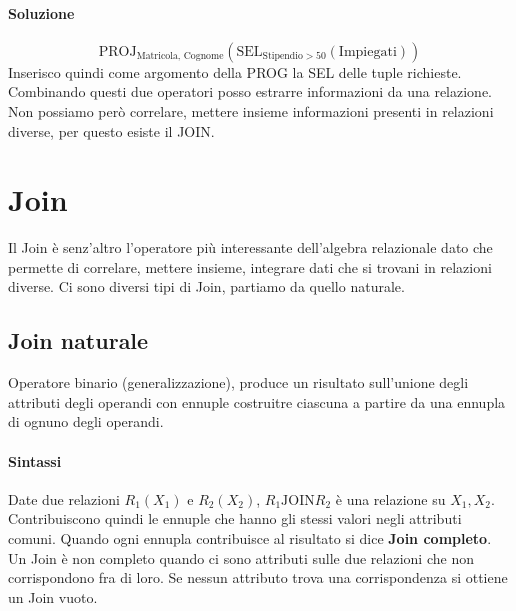 \paragraph*{Soluzione}
\begin{equation*}
    \text{PROJ}_{\text{Matricola, Cognome}}(\text{SEL}_{\text{Stipendio} > 50}(\text{Impiegati}))
\end{equation*}
Inserisco quindi come argomento della PROG la SEL delle tuple richieste. Combinando questi due
operatori posso estrarre informazioni da una relazione. Non possiamo però correlare,
mettere insieme informazioni presenti in relazioni diverse, per questo esiste il JOIN.

\section{Join}
Il Join è senz'altro l'operatore più interessante dell'algebra relazionale dato che permette
di correlare, mettere insieme, integrare dati che si trovani in relazioni diverse. Ci sono
diversi tipi di Join, partiamo da quello naturale.
\subsection*{Join naturale}
Operatore binario (generalizzazione), produce un risultato sull'unione degli attributi
degli operandi con ennuple costruitre ciascuna a partire da una ennupla di ognuno degli operandi.
\paragraph*{Sintassi} Date due relazioni $R_1(X_1)$ e $R_2(X_2)$, $R_1 \text{JOIN} R_2$ è una
relazione su $X_1, X_2$. Contribuiscono quindi le ennuple che hanno gli stessi valori negli attributi
comuni. Quando ogni ennupla contribuisce al risultato si dice \textbf{Join completo}.\\
Un Join è non completo quando ci sono attributi sulle due relazioni che non corrispondono fra di loro. Se
nessun attributo trova una corrispondenza si ottiene un Join vuoto.

